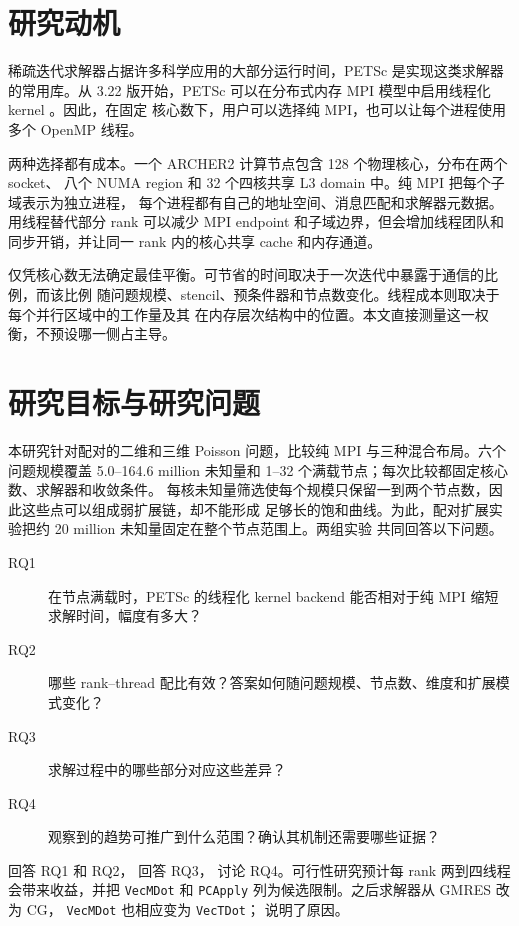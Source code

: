 \documentclass[11pt,a4paper,oneside]{report}
\begin{document}
\section{研究动机}
\label{sec:motivation}
稀疏迭代求解器占据许多科学应用的大部分运行时间，PETSc
\cite{petsc_manual_324,petsc1997} 是实现这类求解器的常用库。从 3.22 版开始，PETSc
可以在分布式内存 MPI 模型中启用线程化 kernel \cite{petsc_openmp_backend}。因此，在固定
核心数下，用户可以选择纯 MPI，也可以让每个进程使用多个 OpenMP 线程。

两种选择都有成本。一个 ARCHER2 计算节点包含 128 个物理核心，分布在两个 socket、
八个 NUMA region 和 32 个四核共享 L3 domain 中。纯 MPI 把每个子域表示为独立进程，
每个进程都有自己的地址空间、消息匹配和求解器元数据。用线程替代部分 rank 可以减少
MPI endpoint 和子域边界，但会增加线程团队和同步开销，并让同一 rank 内的核心共享
cache 和内存通道。

仅凭核心数无法确定最佳平衡。可节省的时间取决于一次迭代中暴露于通信的比例，而该比例
随问题规模、stencil、预条件器和节点数变化。线程成本则取决于每个并行区域中的工作量及其
在内存层次结构中的位置。本文直接测量这一权衡，不预设哪一侧占主导。

\section{研究目标与研究问题}
\label{sec:aims}
本研究针对配对的二维和三维 Poisson 问题，比较纯 MPI 与三种混合布局。六个问题规模覆盖
5.0--164.6 million 未知量和 1--32 个满载节点；每次比较都固定核心数、求解器和收敛条件。
每核未知量筛选使每个规模只保留一到两个节点数，因此这些点可以组成弱扩展链，却不能形成
足够长的饱和曲线。为此，配对扩展实验把约 20 million 未知量固定在整个节点范围上。两组实验
共同回答以下问题。

\begin{description}
  \item[RQ1] 在节点满载时，PETSc 的线程化 kernel backend 能否相对于纯 MPI 缩短
    求解时间，幅度有多大？
  \item[RQ2] 哪些 rank--thread 配比有效？答案如何随问题规模、节点数、维度和扩展模式变化？
  \item[RQ3] 求解过程中的哪些部分对应这些差异？
  \item[RQ4] 观察到的趋势可推广到什么范围？确认其机制还需要哪些证据？
\end{description}

 回答 RQ1 和 RQ2， 回答 RQ3，
 讨论 RQ4。可行性研究预计每 rank 两到四线程会带来收益，并把
\texttt{VecMDot} 和 \texttt{PCApply} 列为候选限制。之后求解器从 GMRES 改为 CG，
\texttt{VecMDot} 也相应变为 \texttt{VecTDot}； 说明了原因。
\end{document}
